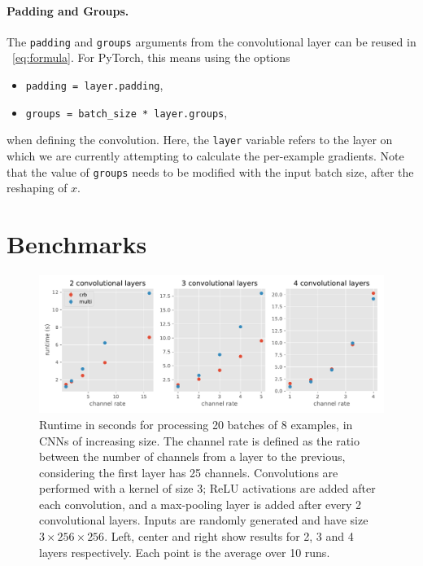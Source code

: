 \documentclass[11pt]{article}
\begin{document}
\paragraph{Padding and Groups.}
%
The \verb?padding? and \verb?groups? arguments from the convolutional layer
can be reused in ~\eqref{eq:formula}. For PyTorch, this means using the
options
%
\begin{itemize}
    \item \texttt{padding = layer.padding},
    \item \texttt{groups = batch\_size * layer.groups},
\end{itemize}
%
when defining the convolution. Here, the \texttt{layer} variable refers 
to the layer on which we are currently attempting to calculate the per-example
gradients. Note that the value of \texttt{groups} needs to be modified with
the input batch size, after the reshaping of $x$.

\section{Benchmarks}

\begin{figure}[ht]
    \centering
    \includegraphics[width=\textwidth]{img/exp1_ks3}
    \caption{Runtime in seconds for processing 20 batches of 8 examples, in
    CNNs of increasing size. The channel rate is defined as the ratio
    between the number of channels from a layer to the previous, considering
    the first layer has 25 channels. Convolutions are performed with a kernel
    of size 3; ReLU activations are added after each convolution, and a
    max-pooling layer is added after every 2 convolutional layers. Inputs
    are randomly generated and have size $3 \times 256 \times 256$. Left,
    center and right show results for 2, 3 and 4 layers respectively. Each
    point is the average over 10 runs.}
    \label{fig:experiment_cnns}
\end{figure}
\end{document}
